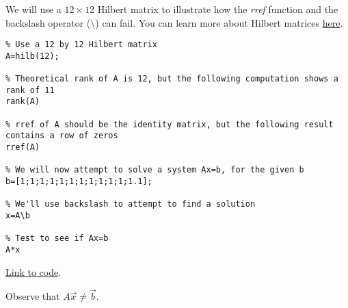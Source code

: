 \documentclass{ximera}
\begin{document}
\begin{example}
    We will use a $12\times 12$ Hilbert matrix to illustrate how the \emph{rref} function and the backslash operator ($\setminus$) can fail.  You can learn more about Hilbert matrices \href{https://en.wikipedia.org/wiki/Hilbert_matrix}{here}.

\begin{verbatim}
% Use a 12 by 12 Hilbert matrix
A=hilb(12);

% Theoretical rank of A is 12, but the following computation shows a rank of 11
rank(A)

% rref of A should be the identity matrix, but the following result contains a row of zeros
rref(A)

% We will now attempt to solve a system Ax=b, for the given b
b=[1;1;1;1;1;1;1;1;1;1;1;1.1];

% We'll use backslash to attempt to find a solution
x=A\b

% Test to see if Ax=b
A*x

\end{verbatim}

\href{https://sagecell.sagemath.org/?z=eJxtkbFuwyAQhnck3uGWqEkVVSJr5MFbH6BVh7YD2OcYBUMER2z36XvYSdUhQkLodHzf8bOB94SgQR3AzGV_tc5gJBg0RTtJUVc9V7bqsDtKIcUG3noMEck22kHU_gyhgxps4st7MJmAeoQuOBdG60_QhOGSSZMNHlIfxsSy-zWlpCjnbb1b2TFit_K4NbsWDC4426InS_NtqkeeiCk7Yp0nbf1iCWNh_WAMiT2M_vN8IIzWOfDcoolwuDAuQAruWsJIc-Ia1FNl9qyIi-pkr-jBSGGqT3V8uF7U9_EueGJ85miNbs7J6dQXwT9XZ31bVMHlko0UU1V_mVvEmNZ5kJ_eLXPwRzxPv6PhhhA=&lang=octave&interacts=eJyLjgUAARUAuQ==}{Link to code}.

Observe that $A\vec{x}\neq\vec{b}$. 
\end{example}

  
\end{document}
